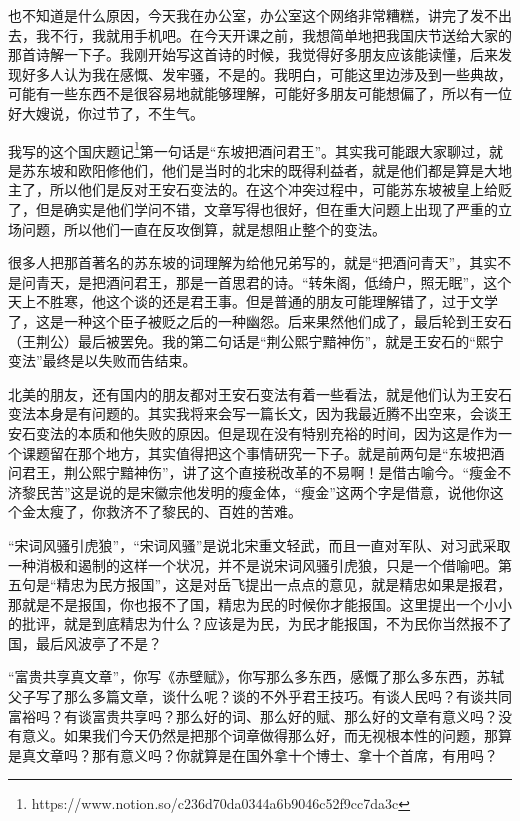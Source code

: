 \documentclass[UTF8, 12pt, a4paper]{ctexrep}
\begin{document}
也不知道是什么原因，今天我在办公室，办公室这个网络非常糟糕，讲完了发不出去，我不行，我就用手机吧。在今天开课之前，我想简单地把我国庆节送给大家的那首诗解一下子。我刚开始写这首诗的时候，我觉得好多朋友应该能读懂，后来发现好多人认为我在感慨、发牢骚，不是的。我明白，可能这里边涉及到一些典故，可能有一些东西不是很容易地就能够理解，可能好多朋友可能想偏了，所以有一位好大嫂说，你过节了，不生气。

我写的这个国庆题记\footnote{https://www.notion.so/c236d70da0344a6b9046c52f9cc7da3c}第一句话是“东坡把酒问君王”。其实我可能跟大家聊过，就是苏东坡和欧阳修他们，他们是当时的北宋的既得利益者，就是他们都是算是大地主了，所以他们是反对王安石变法的。在这个冲突过程中，可能苏东坡被皇上给贬了，但是确实是他们学问不错，文章写得也很好，但在重大问题上出现了严重的立场问题，所以他们一直在反攻倒算，就是想阻止整个的变法。

很多人把那首著名的苏东坡的词理解为给他兄弟写的，就是“把酒问青天”，其实不是问青天，是把酒问君王，那是一首思君的诗。“转朱阁，低绮户，照无眠”，这个天上不胜寒，他这个谈的还是君王事。但是普通的朋友可能理解错了，过于文学了，这是一种这个臣子被贬之后的一种幽怨。后来果然他们成了，最后轮到王安石（王荆公）最后被罢免。我的第二句话是“荆公熙宁黯神伤”，就是王安石的“熙宁变法”最终是以失败而告结束。

北美的朋友，还有国内的朋友都对王安石变法有着一些看法，就是他们认为王安石变法本身是有问题的。其实我将来会写一篇长文，因为我最近腾不出空来，会谈王安石变法的本质和他失败的原因。但是现在没有特别充裕的时间，因为这是作为一个课题留在那个地方，其实值得把这个事情研究一下子。就是前两句是“东坡把酒问君王，荆公熙宁黯神伤”，讲了这个直接税改革的不易啊！是借古喻今。“瘦金不济黎民苦”这是说的是宋徽宗他发明的瘦金体，“瘦金”这两个字是借意，说他你这个金太瘦了，你救济不了黎民的、百姓的苦难。

“宋词风骚引虎狼”，“宋词风骚”是说北宋重文轻武，而且一直对军队、对习武采取一种消极和遏制的这样一个状况，并不是说宋词风骚引虎狼，只是一个借喻吧。第五句是“精忠为民方报国”，这是对岳飞提出一点点的意见，就是精忠如果是报君，那就是不是报国，你也报不了国，精忠为民的时候你才能报国。这里提出一个小小的批评，就是到底精忠为什么？应该是为民，为民才能报国，不为民你当然报不了国，最后风波亭了不是？

“富贵共享真文章”，你写《赤壁赋》，你写那么多东西，感慨了那么多东西，苏轼父子写了那么多篇文章，谈什么呢？谈的不外乎君王技巧。有谈人民吗？有谈共同富裕吗？有谈富贵共享吗？那么好的词、那么好的赋、那么好的文章有意义吗？没有意义。如果我们今天仍然是把那个词章做得那么好，而无视根本性的问题，那算是真文章吗？那有意义吗？你就算是在国外拿十个博士、拿十个首席，有用吗？
\end{document}

